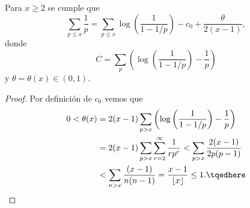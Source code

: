\documentclass[teoria-numeros.tex]{subfiles}
\begin{document}
\addtocounter{thmi}{1}
\begin{slem}
	Para $x \ge 2$ se cumple que
	$$ \sum_{p\le x} \frac{1}{p} = \sum_{p\le x} \log\left( \frac{1}{1 - 1/p} \right) - c_0 + \frac{\theta}{2(x - 1)}, $$
	donde
	\begin{equation}
		C = \sum_{p} \left( \log\left( \frac{1}{1 - 1/p} \right) - \frac{1}{p} \right)
		\label{eqn:mertens_2.5}
	\end{equation}
	y $\theta = \theta(x) \in (0, 1)$.
\end{slem}
\begin{proof}
	Por definición de $c_0$ vemos que
	\begin{align*}
		0 < \theta(x) &= 2(x-1) \sum_{p > x} \left( \log\left( \frac{1}{1 - 1/p} \right) - \frac{1}{p} \right) \\
		              &= 2(x-1) \sum_{p > x} \sum_{r=2}^{\infty} \frac{1}{r p^r} < \sum_{p > x} \frac{2(x-1)}{2p(p-1)} \\
			      &< \sum_{n>x} \frac{(x-1)}{n(n-1)} = \frac{x - 1}{\lfloor x \rfloor} \le 1.
			      \tqedhere
	\end{align*}
\end{proof}
\addtocounter{thmi}{-1}
\end{document}
